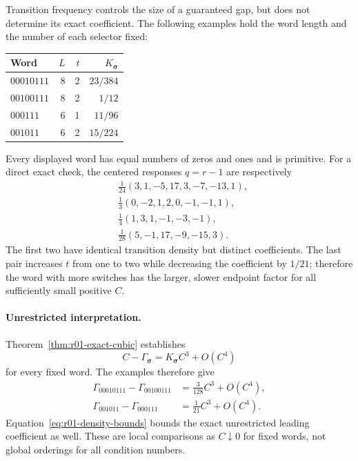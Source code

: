 Transition frequency controls the size of a guaranteed gap, but does not
determine its exact coefficient. The following examples hold the word length
and the number of each selector fixed:
\begin{center}
\begin{tabular}{lrrr}
\hline
Word & $L$ & $t$ & $K_{\bm\sigma}$\\
\hline
$00010111$ & 8 & 2 & $23/384$\\
$00100111$ & 8 & 2 & $1/12$\\
$000111$   & 6 & 1 & $11/96$\\
$001011$   & 6 & 2 & $15/224$\\
\hline
\end{tabular}
\end{center}
Every displayed word has equal numbers of zeros and ones and is primitive.
For a direct exact check, the centered responses $q=r-1$ are respectively
\[
\begin{aligned}
 &\tfrac1{24}(3,1,-5,17,3,-7,-13,1),\\
 &\tfrac1{3}(0,-2,1,2,0,-1,-1,1),\\
 &\tfrac1{4}(1,3,1,-1,-3,-1),\\
 &\tfrac1{28}(5,-1,17,-9,-15,3).
\end{aligned}
\]
The first two have identical transition density but distinct coefficients.
The last pair increases $t$ from one to two while decreasing the coefficient
by $1/21$; therefore the word with more switches has the larger, slower
endpoint factor for all sufficiently small positive $C$.

\paragraph{Unrestricted interpretation.}
Theorem~\ref{thm:r01-exact-cubic} establishes
\[
 C-\Gamma_{\bm\sigma}=K_{\bm\sigma}C^3+O(C^4)
\]
for every fixed word. The examples therefore give
\[
\begin{aligned}
 \Gamma_{00010111}-\Gamma_{00100111}
    &=\tfrac{3}{128}C^3+O(C^4),\\
 \Gamma_{001011}-\Gamma_{000111}
    &=\tfrac1{21}C^3+O(C^4).
\end{aligned}
\]
Equation~\eqref{eq:r01-density-bounds} bounds the exact
unrestricted leading coefficient as well. These are local comparisons
as $C\downarrow0$ for fixed words, not global orderings for all condition
numbers.

